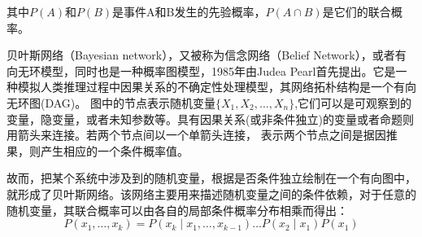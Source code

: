 其中$P(A)$和$P(B)$是事件A和B发生的先验概率，${P(A \cap B)}$是它们的联合概率。

贝叶斯网络（Bayesian network），又被称为信念网络（Belief Network），或者有向无环模型，同时也是一种概率图模型，1985年由Judea Pearl\cite{pearl1985bayesian}首先提出。它是一种模拟人类推理过程中因果关系的不确定性处理模型，其网络拓朴结构是一个有向无环图(DAG)。
图中的节点表示随机变量$\{X_1,X_2,...,X_n\}$,它们可以是可观察到的变量，隐变量，或者未知参数等。具有因果关系(或非条件独立)的变量或者命题则用箭头来连接。若两个节点间以一个单箭头连接，
表示两个节点之间是据因推果，则产生相应的一个条件概率值。

故而，把某个系统中涉及到的随机变量，根据是否条件独立绘制在一个有向图中，就形成了贝叶斯网络。该网络主要用来描述随机变量之间的条件依赖，对于任意的随机变量，其联合概率可以由各自的局部条件概率分布相乘而得出：
\begin{equation}
	\label{bayesnet}
	P\left(x_1, \ldots, x_k\right)=P\left(x_k \mid x_1, \ldots, x_{k-1}\right) \ldots P\left(x_2 \mid x_1\right) P\left(x_1\right)
\end{equation}




